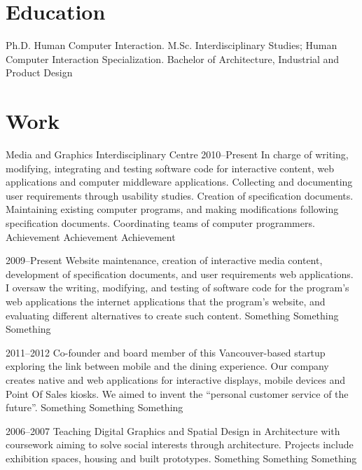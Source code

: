 \documentclass[short]{rvca}
\begin{document}
\section{Education}
Ph.D. Human Computer Interaction.
M.Sc. Interdisciplinary Studies; Human Computer Interaction Specialization.
Bachelor of Architecture, Industrial and Product Design

\section{Work}


\workitem
{Media and Graphics Interdisciplinary Centre}%
{2010--Present}%
{In charge of writing, modifying, integrating and testing software code for interactive content, web applications and computer middleware applications. Collecting and documenting user requirements through usability studies. Creation of specification documents. Maintaining existing computer programs, and making modifications following specification documents. Coordinating teams of computer programmers.}%
{Achievement}%
{Achievement}%
{Achievement}%

{2009--Present}
{Website maintenance, creation of interactive media content, development of specification documents, and user requirements web applications. I oversaw the writing, modifying, and testing of software code for the program's web applications the internet applications that the program's website, and evaluating different alternatives to create such content.}
{Something}
{Something}
{Something}

{2011--2012}
{Co-founder and board member of this Vancouver-based startup exploring the link between mobile and the dining experience. Our company creates native and web applications for interactive displays, mobile devices and Point Of Sales kiosks. We aimed to invent the ``personal customer service of the future''.}
{Something}
{Something}
{Something}

{2006--2007}
{Teaching Digital Graphics and Spatial Design in Architecture with coursework aiming to solve social interests through architecture. Projects include exhibition spaces, housing and built prototypes.}
{Something}
{Something}
{Something}
\end{document}

